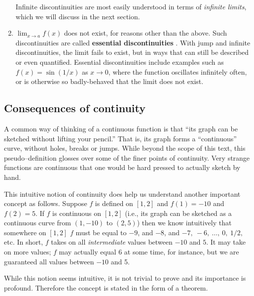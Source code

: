 \begin{enumerate}
Infinite discontinuities are most easily understood in terms of \textit{infinite limits}, which we will discuss in the next section.



\item $\lim_{x\to a}f(x)$ does not exist, for reasons other than the above. Such discontinuities are called \textbf{essential discontinuities} . With jump and infinite discontinuities, the limit fails to exist, but in ways that can still be described or even quantified. Essential discontinuities include examples such as $f(x)=\sin(1/x)$ as $x\to 0$, where the function oscillates infinitely often, or is otherwise so badly-behaved that the limit does not exist.
\end{enumerate}


\subsection*{Consequences of continuity}
A common way of thinking of a continuous function is that ``its graph can be sketched without lifting your pencil.'' That is, its graph forms a ``continuous'' curve, without holes, breaks or jumps. 
While beyond the scope of this text, this pseudo--definition glosses over some of the finer points of continuity. Very strange functions are continuous that one would be hard pressed to actually sketch by hand. 

This intuitive notion of continuity does help us understand another important concept as follows. Suppose $f$ is defined on $[1,2]$ and $f(1) = -10$ and $f(2) = 5$. If $f$ is continuous on $[1,2]$ (i.e., its graph can be sketched as a continuous curve from $(1,-10)$ to $(2,5)$) then we know intuitively that somewhere on $[1,2]$ $f$ must be equal to $-9$, and $-8$, and $-7,\ -6,\ \ldots,\ 0,\ 1/2,$ etc. In short, $f$ takes on all \textit{intermediate} values between $-10$ and $5$. It may take on more values; $f$ may actually equal 6 at some time, for instance, but we are guaranteed all values between $-10$ and 5. 

While this notion seems intuitive, it is not trivial to prove and its importance is profound. Therefore the concept is stated in the form of a theorem.


